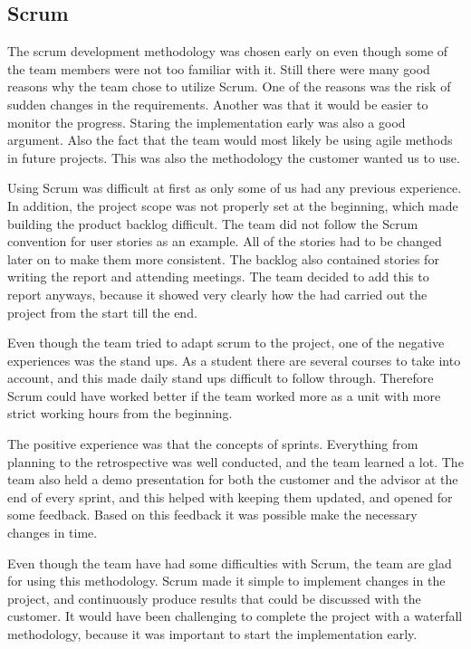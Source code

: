 \subsection{Scrum}
The scrum development methodology was chosen early on even though some of the team members were not too familiar with it.
Still there were many good reasons why the team chose to utilize Scrum.
One of the reasons was the risk of sudden changes in the requirements.
Another was that it would be easier to monitor the progress. Staring the implementation early was also a good argument. Also the fact that the team would most likely be using agile methods in future projects. 
This was also the methodology the customer wanted us to use. 

Using Scrum was difficult at first as only some of us had any previous experience. 
In addition, the project scope was not properly set at the beginning, which made building the product backlog difficult. 
The team did not follow the Scrum convention for user stories as an example. 
All of the stories had to be changed later on to make them more consistent. 
The backlog also contained stories for writing the report and attending meetings.
The team decided to add this to report anyways, because it showed very clearly how the had carried out the project from the start till the end. 

Even though the team tried to adapt scrum to the project, one of the negative experiences was the stand ups. As a student there are several courses to take into account, and this made daily stand ups difficult to follow through. Therefore Scrum could have worked better if the team worked more as a unit with more strict working hours from the beginning.

The positive experience was that the concepts of sprints. Everything from planning to  the retrospective was well conducted, and the team learned a lot. The team also held a demo presentation for both the customer and the advisor at the end of every sprint, and this helped with keeping them updated, and opened for some feedback. Based on this feedback it was possible make the necessary changes in time.

Even though the team have had some difficulties with Scrum, the team are glad for using this methodology. Scrum made it simple to implement changes in the project, and continuously produce results that could be discussed with the customer. It would have been challenging to complete the project with a waterfall methodology, because it was important to start the implementation early.  

